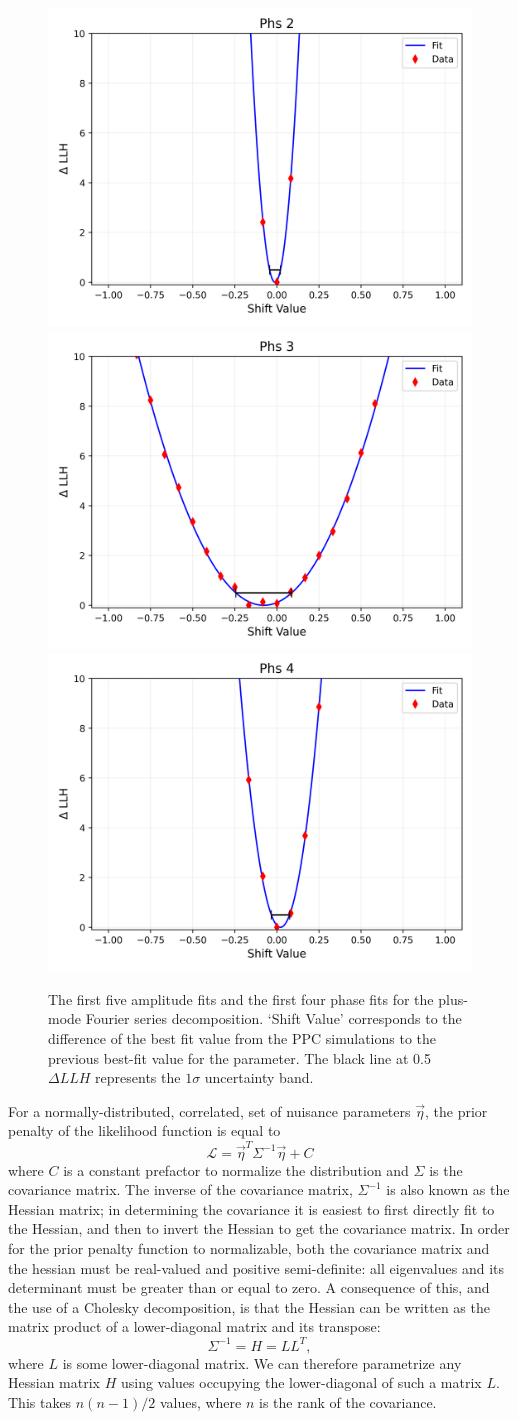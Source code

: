 \documentclass[main.tex]{subfiles}
\begin{document}
\begin{figure}
    \includegraphics[width=0.3\linewidth]{figures/ice_fits/Phs_2_llhfunc.png}%
    \includegraphics[width=0.3\linewidth]{figures/ice_fits/Phs_3_llhfunc.png}%
    \includegraphics[width=0.3\linewidth]{figures/ice_fits/Phs_4_llhfunc.png}
    \caption{The first five amplitude fits and the first four phase fits for the plus-mode Fourier series decomposition. `Shift Value' corresponds to the difference of the best fit value from the PPC simulations to the previous best-fit value for the parameter. The black line at 0.5 $\Delta LLH$ represents the $1\sigma$ uncertainty band.}\label{fig:linearfit}
\end{figure}

For a normally-distributed, correlated, set of nuisance parameters $\vec{\eta}$, the prior penalty of the likelihood function is equal to 
\begin{equation}
    \mathcal{L} = \vec{\eta}^{T} \Sigma^{-1} \vec{\eta} + C
\end{equation} 
where $C$ is a constant prefactor to normalize the distribution and $\Sigma$ is the covariance matrix.
The inverse of the covariance matrix, $\Sigma^{-1}$ is also known as the Hessian matrix; in determining the covariance it is easiest to first directly fit to the Hessian, and then to invert the Hessian to get the covariance matrix.
In order for the prior penalty function to normalizable, both the covariance matrix and the hessian must be real-valued and positive semi-definite: all eigenvalues and its determinant must be greater than or equal to zero. 
A consequence of this, and the use of a Cholesky decomposition, is that the Hessian can be written as the matrix product of a lower-diagonal matrix and its transpose:
\begin{equation}
    \Sigma^{-1} = H = LL^{T},
\end{equation} 
where $L$ is some lower-diagonal matrix. 
We can therefore parametrize any Hessian matrix $H$ using values occupying the lower-diagonal of such a matrix $L$. This takes $n(n-1)/2$ values, where $n$ is the rank of the covariance. 
\end{document}
